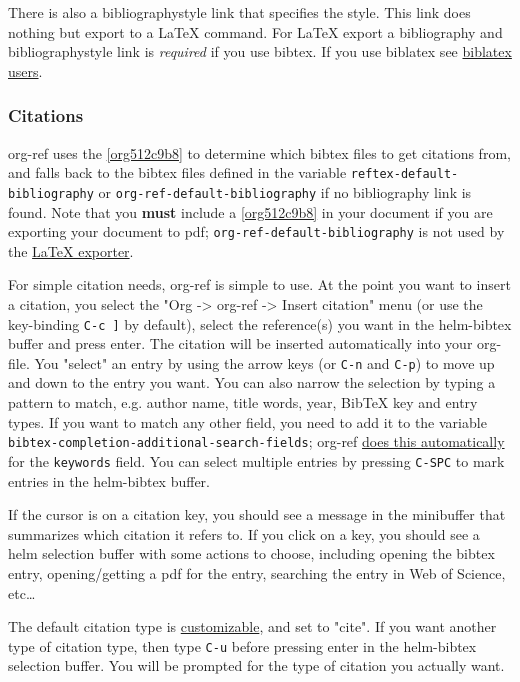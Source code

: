 \documentclass[11pt]{article}
\begin{document}
There is also a bibliographystyle link that specifies the style. This link does nothing but export to a \LaTeX{} command. For \LaTeX{} export a bibliography and bibliographystyle link is \emph{required} if you use bibtex. If you use biblatex see \hyperref[sec:org8aed75f]{biblatex users}.

\subsubsection{Citations}
\label{sec:orga991cc1}

org-ref uses the \ref{org512c9b8} to determine which bibtex files to get citations from, and falls back to the bibtex files defined in the variable \texttt{reftex-default-bibliography} or \texttt{org-ref-default-bibliography} if no bibliography link is found. Note that you \textbf{must} include a \ref{org512c9b8} in your document if you are exporting your document to pdf; \texttt{org-ref-default-bibliography} is not used by the \hyperref[sec:org18026ee]{\LaTeX{} exporter}.

For simple citation needs, org-ref is simple to use. At the point you want to insert a citation, you select the "Org -> org-ref -> Insert citation" menu (or use the key-binding \texttt{C-c ]} by default), select the reference(s) you want in the helm-bibtex buffer and press enter. The citation will be inserted automatically into your org-file. You "select" an entry by using the arrow keys (or \texttt{C-n} and \texttt{C-p}) to move up and down to the entry you want. You can also narrow the selection by typing a pattern to match, e.g. author name, title words, year, BibTeX key and entry types. If you want to match any other field, you need to add it to the variable \texttt{bibtex-completion-additional-search-fields}; org-ref \hyperref[sec:org27a40e8]{does this automatically} for the \texttt{keywords} field. You can select multiple entries by pressing \texttt{C-SPC} to mark entries in the helm-bibtex buffer.

If the cursor is on a citation key, you should see a message in the minibuffer that summarizes which citation it refers to. If you click on a key, you should see a helm selection buffer with some actions to choose, including opening the bibtex entry, opening/getting a pdf for the entry, searching the entry in Web of Science, etc\ldots{}

The default citation type is \hyperref[sec:org69126c1]{customizable}, and set to "cite". If you want another type of citation type, then type \texttt{C-u} before pressing enter in the helm-bibtex selection buffer. You will be prompted for the type of citation you actually want.
\end{document}
